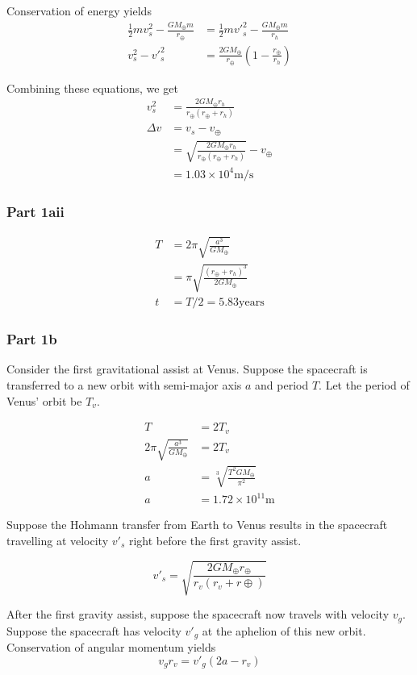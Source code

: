 \documentclass{article}
\begin{document}
Conservation of energy yields
\begin{align}
\frac{1}{2} m v_s^2 - \frac{GM_\oplus m}{r_\oplus} &= \frac{1}{2} m {v'}_s^{2}-\frac{GM_\oplus m}{r_h} \\
v_s^2-{v'}_s^{2} &= \frac{2GM_\oplus}{r_\oplus}\left(1-\frac{r_\oplus}{r_h}\right)
\end{align}

Combining these equations, we get 
\begin{align}
v_s^2 &= \frac{2GM_\oplus r_h}{r_\oplus(r_\oplus + r_h)} \\
\Delta v &= v_s - v_\oplus \\
&= \sqrt{\frac{2GM_\oplus r_h}{r_\oplus(r_\oplus + r_h)}} - v_\oplus \\
&= 1.03 \times 10^4 \mathrm{m/s}
\end{align}

\subsubsection{Part 1aii}
\begin{align}
T &= 2\pi \sqrt{\frac{a^3}{GM_\oplus}} \\
&= \pi \sqrt{\frac{(r_\oplus + r_h)^3}{2GM_\oplus}} \\
t &= T/2 = 5.83 \mathrm{years}
\end{align}

\subsubsection{Part 1b}
Consider the first gravitational assist at Venus. Suppose the spacecraft is transferred to a new orbit with semi-major axis $a$ and period $T$. Let the period of Venus' orbit be $T_v$.

\begin{align}
T &= 2T_v \\
2\pi \sqrt{\frac{a^3}{GM_\oplus}} &= 2T_v \\
a &= \sqrt[3]{\frac{T^2 GM_\oplus}{\pi^2}} \\
a &= 1.72\times10^{11} \mathrm{m}
\end{align}

Suppose the Hohmann transfer from Earth to Venus results in the spacecraft travelling at velocity ${v'}_s$ right before the first gravity assist. 

\[{v'}_s = \sqrt{\frac{2GM_\oplus r_\oplus}{r_v(r_v+r\oplus)}}\]

After the first gravity assist, suppose the spacecraft now travels with velocity $v_g$. Suppose the spacecraft has velocity $v'_g$ at the aphelion of this new orbit. Conservation of angular momentum yields
\[v_g r_v = v'_g(2a - r_v) \]
\end{document}
